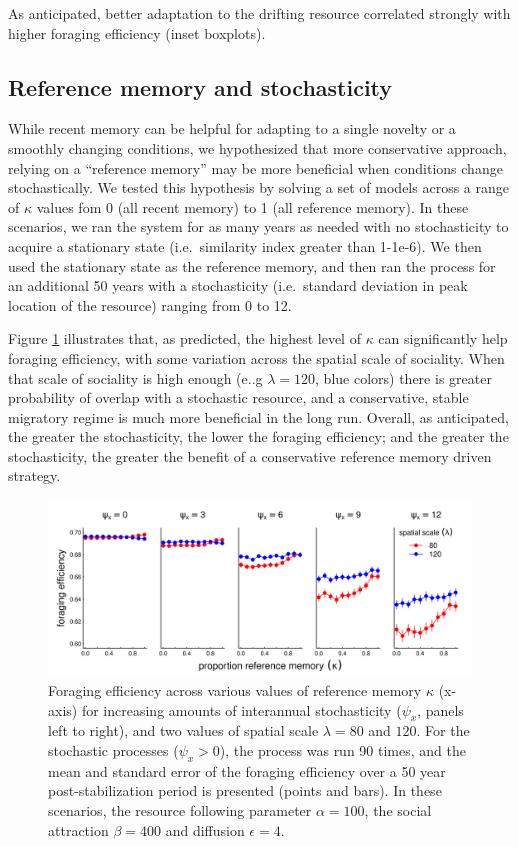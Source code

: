 \documentclass[12pt]{article}
\begin{document}
As anticipated, better adaptation to the drifting resource correlated strongly with higher foraging efficiency (inset boxplots).

\subsection{Reference memory and stochasticity}

While recent memory can be helpful for adapting to a single novelty or a smoothly changing conditions, we hypothesized that more conservative approach, relying on a ``reference memory'' may be more beneficial when conditions change stochastically. We tested this hypothesis by solving a set of models across a range of $\kappa$ values fom 0 (all recent memory) to 1 (all reference memory). In these scenarios, we ran the system for as many years as needed with no stochasticity to acquire a stationary state (i.e.~similarity index greater than 1-1e-6). We then used the stationary state as the reference memory, and then ran the process for an additional 50 years with a stochasticity (i.e.~standard deviation in peak location of the resource) ranging from 0 to 12.

Figure \ref{fig_stochasticity} illustrates that, as predicted, the highest level of $\kappa$ can significantly help foraging efficiency, with some variation across the spatial scale of sociality. When that scale of sociality is high enough (e..g $\lambda = 120$, blue colors) there is greater probability of overlap with a stochastic resource, and a conservative, stable migratory regime is much more beneficial in the long run. Overall, as anticipated, the greater the stochasticity, the lower the foraging efficiency; and the greater the stochasticity, the greater the benefit of a conservative reference memory driven strategy.

\begin{figure}
\includegraphics[width=\textwidth]{figures/Stochasticity.png}

\caption{\label{fig_stochasticity} Foraging efficiency across various values of reference memory $\kappa$ (x-axis) for increasing amounts of interannual stochasticity ($\psi_x$, panels left to right), and two values of spatial scale $\lambda = 80$ and $120$. For the stochastic processes ($\psi_x > 0$), the process was run 90 times, and the mean and standard error of the foraging efficiency over a 50 year post-stabilization period is presented (points and bars). In these scenarios, the resource following parameter $\alpha = 100$, the social attraction $\beta = 400$ and diffusion $\epsilon = 4$.} 

\end{figure}
\end{document}
